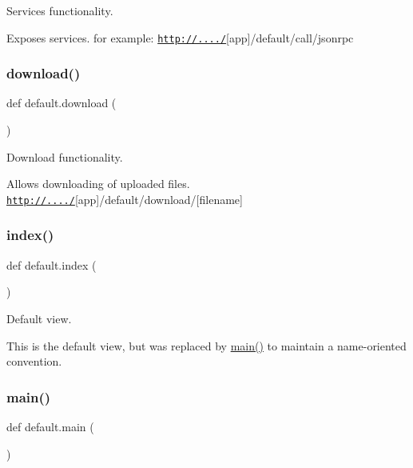 Services functionality. 

Exposes services. for example\+: \href{http://..../}{\tt http\+://..../}\mbox{[}app\mbox{]}/default/call/jsonrpc \mbox{\label{namespacedefault_abcdcbacbec033ad1d6212d4feafc554a}} 
\subsubsection{\texorpdfstring{download()}{download()}}
{\footnotesize\ttfamily def default.\+download (\begin{DoxyParamCaption}{ }\end{DoxyParamCaption})}



Download functionality. 

Allows downloading of uploaded files. \href{http://..../}{\tt http\+://..../}\mbox{[}app\mbox{]}/default/download/\mbox{[}filename\mbox{]} \mbox{\label{namespacedefault_a123594d2c8890b62c80379e191485e3a}} 
\subsubsection{\texorpdfstring{index()}{index()}}
{\footnotesize\ttfamily def default.\+index (\begin{DoxyParamCaption}{ }\end{DoxyParamCaption})}



Default view. 

This is the default view, but was replaced by \hyperlink{namespacedefault_ae42db310ea72fd73d154e75b4d3d46f5}{main()} to maintain a name-\/oriented convention. \mbox{\label{namespacedefault_ae42db310ea72fd73d154e75b4d3d46f5}} 
\subsubsection{\texorpdfstring{main()}{main()}}
{\footnotesize\ttfamily def default.\+main (\begin{DoxyParamCaption}{ }\end{DoxyParamCaption})}



